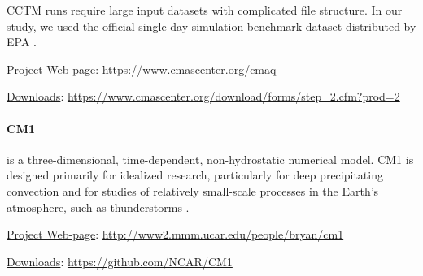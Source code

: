 CCTM runs require large input datasets with complicated file structure.
In our study, we used the official single day simulation benchmark dataset distributed by EPA \cite{EPA}.

\underline{Project Web-page}: \url{https://www.cmascenter.org/cmaq}

\underline{Downloads}: \url{https://www.cmascenter.org/download/forms/step_2.cfm?prod=2}

\iffalse
\underline{Use case description}

The following libraries have to be installed prior to building CCTM: \textit{NetCDF, NetCDF Fortran, IOAPI}. When installed, the following scripts could have been initiated to finish the installation and run the application itself: \textit{config\_cmaq.csh, bldit\_project.csh, bldit\_cctm.csh, run\_cct.csh}.
Benchmark data have been downloaded based on the information provided by EPA for a single day \cite{EPA}.
\fi

\paragraph{CM1} is a three-dimensional, time-dependent, non-hydrostatic numerical model. %
CM1 is designed primarily for idealized research, particularly for deep precipitating convection and for studies of relatively small-scale processes in the Earth's atmosphere, such as thunderstorms \cite{CM1}.

\iffalse
CM1 is also designed for distributed-memory computing systems. In CM1 there are three models of parallelization. Shared memory parallelization with OpenMP, distributed memory using MPI and mix of both of them - hybrid OpenMP/MPI.
\fi

\underline{Project Web-page}: \url{http://www2.mmm.ucar.edu/people/bryan/cm1}

\underline{Downloads}: \url{https://github.com/NCAR/CM1}

\iffalse
\underline{Use case description}

CM1 use case contains the following steps: CM1 software download and unpack  \cite{CM1DATA}, compilation and build. When successfully compiled, a \textit{cm1.exe} binary file is created under \textit{cm1r19/run} directory. \textit{cm1r19/ run/ namelist.input} configuration file was used with appropriate \textit{nodex, nodey} and \textit{ppnode} values to let the simulation start on the given number of processors (NP). The simulation is started by calling mpirun: \textit{mpirun -np \$NP ./cm1.exe}
\fi

